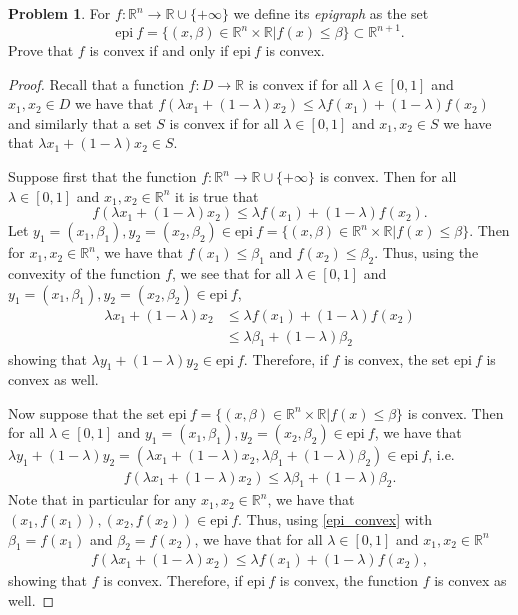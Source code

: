 \documentclass[12pt]{article}
\theoremstyle{definition}
\newtheorem{problem}{Problem}
\begin{document}
\begin{problem}
  For $f: \mathbb{R}^n \to \mathbb{R} \cup \{+\infty\}$ we define its \textit{epigraph}
  as the set
  \[
   \text{epi}\ f = \{(x, \beta) \in \mathbb{R}^n \times \mathbb{R} | f(x) \leq \beta \} \subset \mathbb{R}^{n+1}.
  \]
  Prove that $f$ is convex if and only if $\text{epi}\ f$ is convex.
\end{problem}

\begin{proof}
  Recall that a function $f: D \to \mathbb{R}$ is convex if for all $\lambda \in [0, 1]$ and $x_1, x_2 \in D$
  we have that $f(\lambda x_1 + (1-\lambda)x_2) \leq \lambda f(x_1) + (1-\lambda)f(x_2)$
  and similarly that a set $S$ is convex if for all $\lambda \in [0, 1]$ and $x_1, x_2 \in S$
  we have that $\lambda x_1 + (1- \lambda) x_2 \in S$.

  Suppose first that the function $f: \mathbb{R}^n \to \mathbb{R} \cup \{+\infty\}$ is convex.
  Then for all $\lambda \in [0, 1]$ and $x_1, x_2 \in \mathbb{R}^n$ it is true that
  $$f(\lambda x_1 + (1-\lambda)x_2) \leq \lambda f(x_1) + (1-\lambda)f(x_2).$$
  Let $y_1 = (x_1, \beta_1), y_2 = (x_2, \beta_2) \in \text{epi}\ f = \{(x, \beta) \in \mathbb{R}^n \times \mathbb{R} | f(x) \leq \beta \}$.
  Then for $x_1, x_2 \in \mathbb{R}^n$, we have that $f(x_1) \leq \beta_1$ and
  $f(x_2) \leq \beta_2$. Thus, using the convexity of the function $f$, we see that for all $\lambda \in [0,1]$ and
  $y_1 = (x_1, \beta_1), y_2 = (x_2, \beta_2) \in \text{epi}\ f$,
  \begin{align*}
    \lambda x_1 + (1-\lambda) x_2
    &\leq \lambda f(x_1) + (1-\lambda)f(x_2) \\
    &\leq \lambda \beta_1 + (1-\lambda) \beta_2
  \end{align*}
  showing that $\lambda y_1 + (1-\lambda) y_2 \in \text{epi}\ f$. Therefore, if
  $f$ is convex, the set $\text{epi}\ f$ is convex as well.

  Now suppose that the set $\text{epi}\ f= \{(x, \beta) \in \mathbb{R}^n \times \mathbb{R} | f(x) \leq \beta \}$
  is convex. Then for all $\lambda \in [0, 1]$ and
  $y_1 = (x_1, \beta_1), y_2 = (x_2, \beta_2) \in \text{epi}\ f$, we have that
  $\lambda y_1 + (1-\lambda) y_2 = (\lambda x_1 + (1-\lambda)x_2, \lambda \beta_1 + (1-\lambda)\beta_2) \in \text{epi}\ f$, i.e.\
  \begin{align}\label{epi_convex}
    f(\lambda x_1 + (1-\lambda)x_2) \leq \lambda \beta_1 + (1-\lambda) \beta_2.
  \end{align}
  Note that in particular for any $x_1, x_2 \in \mathbb{R}^n$, we have that
  $(x_1, f(x_1)), (x_2, f(x_2)) \in \text{epi}\ f$.
  Thus, using \eqref{epi_convex} with $\beta_1 = f(x_1)$ and $\beta_2 = f(x_2)$,
  we have that for all $\lambda \in [0,1]$ and $x_1, x_2 \in \mathbb{R}^n$
  \begin{align*}
    f(\lambda x_1 + (1-\lambda)x_2) \leq \lambda f(x_1) + (1-\lambda) f(x_2),
  \end{align*}
  showing that $f$ is convex.
  Therefore, if $\text{epi}\ f$ is convex, the function $f$ is convex as well.

\end{proof}
\end{document}

